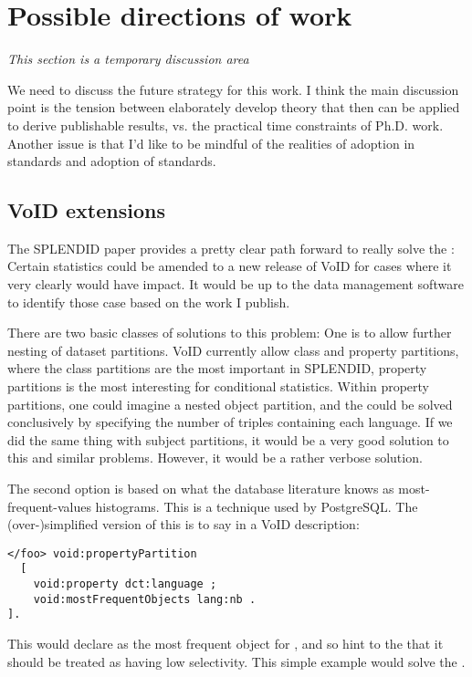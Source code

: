 \section{Possible directions of work}

\emph{This section is a temporary discussion area}

We need to discuss the future strategy for this work. I think the main
discussion point is the tension between elaborately develop theory
that then can be applied to derive publishable results, vs. the
practical time constraints of Ph.D. work. Another issue is that I'd
like to be mindful of the realities of adoption in standards and
adoption of standards.

\subsection{VoID extensions}

The SPLENDID paper provides a pretty clear path forward to really
solve the \langcase: Certain statistics could be amended to a new
release of VoID for cases where it very clearly would have impact. It
would be up to the data management software to identify those case
based on the work I publish.

There are two basic classes of solutions to this problem: One is to
allow further nesting of dataset partitions. VoID currently allow
class and property partitions, where the class partitions are the most
important in SPLENDID, property partitions is the most interesting for
conditional statistics. Within property partitions, one could imagine
a nested object partition, and the \langcase{} could be solved
conclusively by specifying the number of triples containing each
language. If we did the same thing with subject partitions, it would
be a very good solution to this and similar problems. However, it
would be a rather verbose solution. 

The second option is based on what the database literature knows as
most-frequent-values histograms. This is a technique used by
PostgreSQL. The (over-)simplified version of this is to say in a VoID
description: 

\begin{verbatim}
</foo> void:propertyPartition 
  [
    void:property dct:language ;
    void:mostFrequentObjects lang:nb .
].
\end{verbatim}
This would declare  as the most frequent object for
, and so hint to the \fedeng that it should be
treated as having low selectivity. This simple example would solve the
\langcase. 

